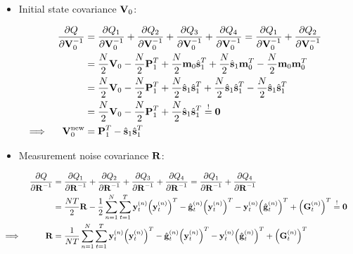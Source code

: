 	\begin{itemize}
		\item Initial state covariance \(\boldsymbol{\mathrm{V}}_0\):
	\end{itemize}
	\begin{align}
		&&\pdv{Q}{\boldsymbol{\mathrm{V}}_0^{-1}}
			&= \pdv{Q_1}{\boldsymbol{\mathrm{V}}_0^{-1}} + \pdv{Q_2}{\boldsymbol{\mathrm{V}}_0^{-1}} + \pdv{Q_3}{\boldsymbol{\mathrm{V}}_0^{-1}} + \pdv{Q_4}{\boldsymbol{\mathrm{V}}_0^{-1}} = \pdv{Q_1}{\boldsymbol{\mathrm{V}}_0^{-1}} + \pdv{Q_2}{\boldsymbol{\mathrm{V}}_0^{-1}} & \nonumber \\
		&&	&= \frac{N}{2} \boldsymbol{\mathrm{V}}_0 - \frac{N}{2} \boldsymbol{\mathrm{P}}_1^T + \frac{N}{2} \boldsymbol{\mathrm{m}}_0 \hat{\boldsymbol{\mathrm{s}}}_1^T + \frac{N}{2} \hat{\boldsymbol{\mathrm{s}}}_1 \boldsymbol{\mathrm{m}}_0^T - \frac{N}{2} \boldsymbol{\mathrm{m}}_0 \boldsymbol{\mathrm{m}}_0^T & \nonumber \\
		&&	&= \frac{N}{2} \boldsymbol{\mathrm{V}}_0 - \frac{N}{2} \boldsymbol{\mathrm{P}}_1^T + \frac{N}{2} \hat{\boldsymbol{\mathrm{s}}}_1 \hat{\boldsymbol{\mathrm{s}}}_1^T + \frac{N}{2} \hat{\boldsymbol{\mathrm{s}}}_1 \hat{\boldsymbol{\mathrm{s}}}_1^T - \frac{N}{2} \hat{\boldsymbol{\mathrm{s}}}_1 \hat{\boldsymbol{\mathrm{s}}}_1^T & \nonumber \\
		&&	&= \frac{N}{2} \boldsymbol{\mathrm{V}}_0 - \frac{N}{2} \boldsymbol{\mathrm{P}}_1^T + \frac{N}{2} \hat{\boldsymbol{\mathrm{s}}}_1 \hat{\boldsymbol{\mathrm{s}}}_1^T \overset{!}{=} \boldsymbol{\mathrm{0}} & \nonumber \\
		\implies && \boldsymbol{\mathrm{V}}_0^{\mathrm{new}} &= \boldsymbol{\mathrm{P}}_1^T - \hat{\boldsymbol{\mathrm{s}}}_1 \hat{\boldsymbol{\mathrm{s}}}_1^T & \label{eqn:initialStateCovariance}
	\end{align}
	
	\begin{itemize}
		\item Measurement noise covariance \(\boldsymbol{\mathrm{R}}\):
	\end{itemize}
	\begin{align}
		&&\pdv{Q}{\boldsymbol{\mathrm{R}}^{-1}}
			&= \pdv{Q_1}{\boldsymbol{\mathrm{R}}^{-1}} + \pdv{Q_2}{\boldsymbol{\mathrm{R}}^{-1}} + \pdv{Q_3}{\boldsymbol{\mathrm{R}}^{-1}} + \pdv{Q_4}{\boldsymbol{\mathrm{R}}^{-1}} = \pdv{Q_1}{\boldsymbol{\mathrm{R}}^{-1}} + \pdv{Q_4}{\boldsymbol{\mathrm{R}}^{-1}} & \nonumber \\
		&&	&= \frac{NT}{2} \boldsymbol{\mathrm{R}} - \frac{1}{2} \sum_{n = 1}^{N} \sum_{t = 1}^{T} \boldsymbol{\mathrm{y}}_t^{(n)} \Big(\boldsymbol{\mathrm{y}}_t^{(n)}\Big)^T - \hat{\boldsymbol{\mathrm{g}}}_t^{(n)} \Big(\boldsymbol{\mathrm{y}}_t^{(n)}\Big)^T - \boldsymbol{\mathrm{y}}_t^{(n)} \Big(\hat{\boldsymbol{\mathrm{g}}}_t^{(n)}\Big)^T + \Big(\boldsymbol{\mathrm{G}}_t^{(n)}\Big)^T \overset{!}{=} \boldsymbol{\mathrm{0}} & \nonumber \\
		\implies && \boldsymbol{\mathrm{R}} &= \frac{1}{NT} \sum_{n = 1}^{N} \sum_{t = 1}^{T} \boldsymbol{\mathrm{y}}_t^{(n)} \Big(\boldsymbol{\mathrm{y}}_t^{(n)}\Big)^T - \hat{\boldsymbol{\mathrm{g}}}_t^{(n)} \Big(\boldsymbol{\mathrm{y}}_t^{(n)}\Big)^T - \boldsymbol{\mathrm{y}}_t^{(n)} \Big(\hat{\boldsymbol{\mathrm{g}}}_t^{(n)}\Big)^T + \Big(\boldsymbol{\mathrm{G}}_t^{(n)}\Big)^T & \label{eqn:measurementNoiseCovariance}
	\end{align}
	
